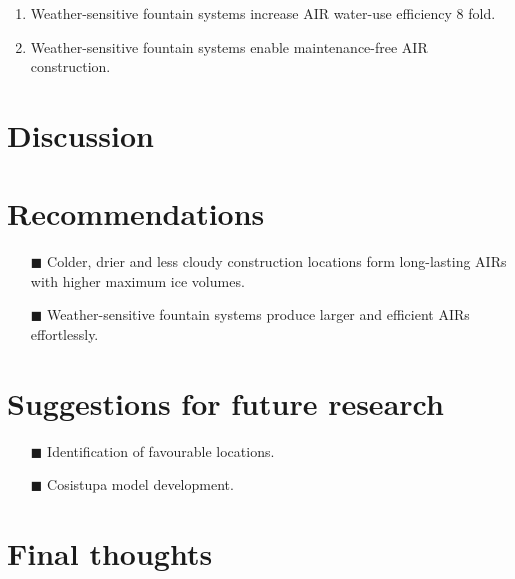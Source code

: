 \begin{enumerate} 

\item Weather-sensitive fountain systems increase AIR water-use efficiency 8 fold.

\item Weather-sensitive fountain systems enable maintenance-free AIR construction.

\end{enumerate}

\section{Discussion}

\section{Recommendations}

\begin{itemize} 

\item[\tiny{$\blacksquare$}] Colder, drier and less cloudy construction locations form long-lasting AIRs with
  higher maximum ice volumes. 

\item[\tiny{$\blacksquare$}] Weather-sensitive fountain systems produce larger and efficient AIRs effortlessly. 

\end{itemize}

\section{Suggestions for future research}

\begin{itemize} 

\item[\tiny{$\blacksquare$}] Identification of favourable locations.

\item[\tiny{$\blacksquare$}] Cosistupa model development.

\end{itemize}

\section{Final thoughts}
